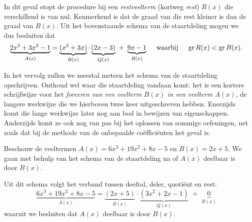 \documentclass{ximera}
\begin{document}
\begin{algorithm}

	In dit geval stopt de procedure bij een {\em restveelterm} (kortweg {\em rest}) $R(x)$ die verschillend is van nul. Kenmerkend is dat de graad van die rest kleiner is dan de graad van $B(x)$. Uit het bovenstaande schema van de staartdeling mogen we dus besluiten dat
	\[
	\underbrace{2x^3+3x^2-1}_{A(x)} = \underbrace{(x^2+3x)}_{B(x)}\cdot\underbrace{(2x - 3)}_{Q(x)} \,\, + \,\, \underbrace{9x - 1}_{R(x)} \quad \text{ waarbij } \quad \operatorname{gr} R(x) < \operatorname{gr} B(x).
	\]

	\end{algorithm} 
	
	In het vervolg zullen we meestal meteen het schema van de staartdeling opschrijven. Onthoud wel waar die staartdeling vandaan komt: het is een kortere schrijfwijze voor het {\em forceren van een veelterm $B(x)$ in een veelterm $A(x)$}, de langere werkwijze die we hierboven twee keer uitgeschreven hebben. Enerzijds komt die lange werkwijze later nog aan bod in bewijzen van eigenschappen. Anderzijds komt ze ook nog van pas bij het oplossen van sommige oefeningen, net zoals dat bij de methode van de onbepaalde coëfficiënten het geval is.
	
	
	\begin{example} 
	Beschouw de veeltermen $A(x) = 6x^3 + 19x^2 + 8x - 5$ en $B(x) = 2x+5$. We gaan met behulp van het schema van de staartdeling na of $A(x)$ deelbaar is door $B(x)$. 
	
	
	Uit dit schema volgt het verband tussen deeltal, deler, quotiënt en rest:
	\[
	\underbrace{6x^3 + 19x^2 + 8x - 5}_{A(x)} = \underbrace{(2x+5)}_{B(x)}\cdot\underbrace{(3x^2+2x-1)}_{Q(x)} \,\, + \,\, \underbrace{0}_{R(x)} 
	\]
	waaruit we besluiten dat $A(x)$ deelbaar is door $B(x)$.
	\end{example} 
	
\end{document}
